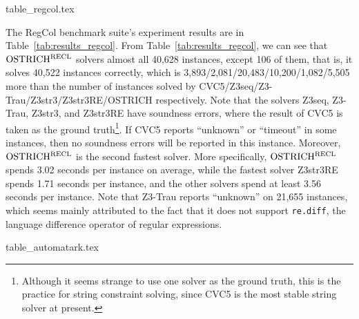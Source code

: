 \begin{table}[ht]
\vspace{-3mm}
\begin{center}
  {table_regcol.tex}
\end{center}
  \caption{Experiment results on RegCol, with timeout = 60 seconds}
  \label{tab:results_regcol}
\vspace{-6mm}
\end{table}

The RegCol benchmark suite's experiment results are in Table~\ref{tab:results_regcol}. 
From Table~\ref{tab:results_regcol}, we can see that $\rm OSTRICH^{RECL}$ solvers almost all 40,628 instances, except 106 of them, that is, it solves 40,522 instances correctly, which is %
3,893/2,081/20,483/10,200/1,082/5,505 more than the number of instances solved by CVC5/Z3seq/Z3-Trau/Z3str3/Z3str3RE/OSTRICH respectively. 
%    
Note that the solvers  Z3seq, Z3-Trau, Z3str3, and Z3str3RE have soundness errors, where the result of CVC5 is taken as the ground truth\footnote{Although it seems strange to use one solver as the ground truth, this is the practice for string constraint solving, since CVC5 is the most stable string solver at present.}. If CVC5 reports ``unknown'' or ``timeout'' in some instances, then no soundness errors will be reported in this instance. 
%
Moreover, $\rm OSTRICH^{RECL}$ is the second fastest solver. More specifically, $\rm OSTRICH^{RECL}$ spends 3.02 seconds per instance on average, while the fastest solver Z3str3RE spends 1.71 seconds per instance, and the other solvers spend at least 3.56 seconds per instance.  
Note that Z3-Trau reports ``unknown'' on 21,655 instances, which seems mainly attributed to the fact that it does not support \verb|re.diff|, the language difference operator of regular expressions. 


\begin{table}[ht]
\begin{center}
  {table_automatark.tex}
\end{center}
  \caption{Experiment results on AutomatArk, with timeout = 60 seconds}
  \label{tab:results_automatark}
\vspace{-6mm}
\end{table}

